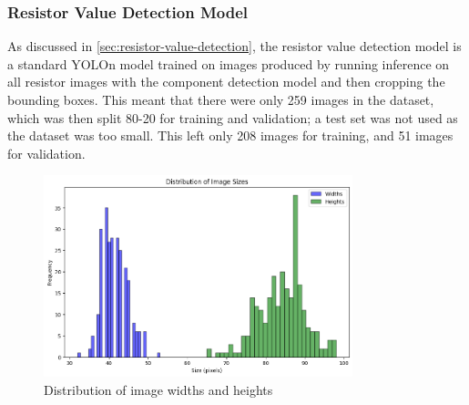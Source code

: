\subsubsection{Resistor Value Detection Model}
As discussed in \autoref{sec:resistor-value-detection}, the resistor value detection model is a standard YOLOn model trained on images produced by running inference on all resistor images with the component detection model and then cropping the bounding boxes. This meant that there were only 259 images in the dataset, which was then split 80-20 for training and validation; a test set was not used as the dataset was too small. This left only 208 images for training, and 51 images for validation.

\begin{figure}[H]
  \centering
  \includegraphics[width=0.8\textwidth]{imgs/graphs/pixel_distrib.png}
  \caption{Distribution of image widths and heights}
  \label{fig:pixel-distrib}
\end{figure}

